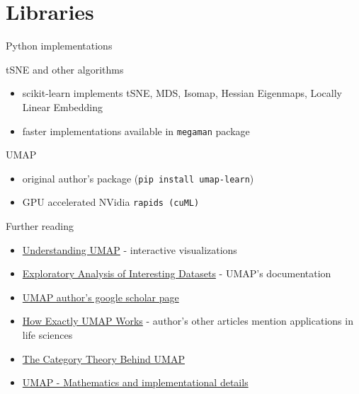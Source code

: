 \documentclass[unknownkeysallowed]{beamer}
\begin{document}
\section{Libraries}
\begin{frame}{Python implementations}

	\begin{block}{tSNE and other algorithms}
		\begin{itemize}
			\item scikit-learn implements tSNE, MDS, Isomap, Hessian Eigenmaps, Locally Linear Embedding
			\item faster implementations available in \texttt{megaman} package
		\end{itemize}
	\end{block}
	
	\begin{block}{UMAP}
		\begin{itemize}
			\item original author's package (\texttt{pip install umap-learn})
			\item GPU accelerated NVidia \texttt{rapids (cuML)} 
		\end{itemize}
	\end{block}
\end{frame}


\begin{frame}{Further reading}

	\begin{itemize}
		\item \href{https://pair-code.github.io/understanding-umap/}{Understanding UMAP} - interactive visualizations
		\item \href{https://umap-learn.readthedocs.io/en/latest/exploratory_analysis.html}{Exploratory Analysis of Interesting Datasets} -  UMAP's documentation
		\item \href{https://scholar.google.com/citations?user=Jb6Z_w8AAAAJ&hl=en}{UMAP author's google scholar page}
		\item \href{https://towardsdatascience.com/how-exactly-umap-works-13e3040e1668}{How Exactly UMAP Works} - author's other articles mention applications in life sciences
		\item \href{https://johncarlosbaez.wordpress.com/2020/02/10/the-category-theory-behind-umap/}{The Category Theory Behind UMAP}
		\item \href{https://www.slideshare.net/UmbertoLupo/umap-mathematics-and-implementational-details}{
UMAP - Mathematics and implementational details
}
	\end{itemize}
\end{frame}
\end{document}
